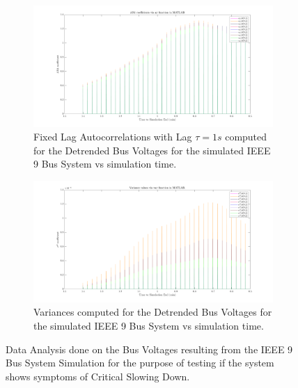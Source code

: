 \begin{figure}[!htpb]
	\begin{subfigure}{\textwidth}
		\centering
		\includegraphics[scale=0.25]{../figures/analysis_matlab/ar1_run02}
		\caption{Fixed Lag Autocorrelations with Lag $\tau = 1s$ computed for the Detrended Bus Voltages for the simulated IEEE 9 Bus System vs simulation time.}
	\end{subfigure}
	
	\begin{subfigure}{\textwidth}
		\centering
		\includegraphics[scale=0.25]{../figures/analysis_matlab/var_run02}
		\caption{Variances computed for the Detrended Bus Voltages for the simulated IEEE 9 Bus System vs simulation time.}
	\end{subfigure}
	
	\caption{Data Analysis done on the Bus Voltages resulting from the IEEE 9 Bus System Simulation for the purpose of testing if the system shows symptoms of Critical Slowing Down.}
	\label{fig:autocorrAndVariance}
\end{figure}

